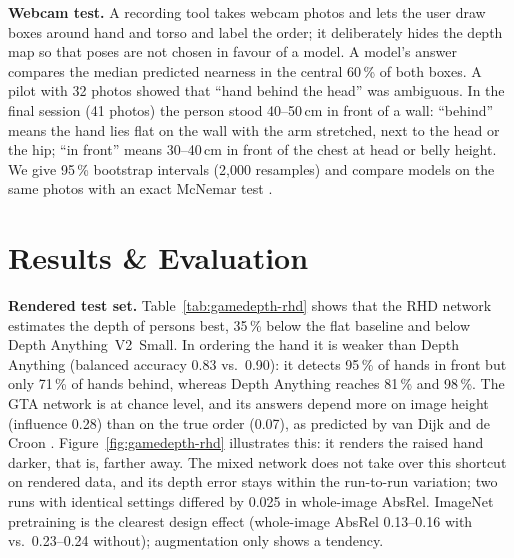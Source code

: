 \documentclass[../../proceedings/main.tex]{subfiles}
\begin{document}
\begin{refsection}
\textbf{Webcam test.} A recording tool takes webcam photos and lets the user
draw boxes around hand and torso and label the order; it deliberately hides
the depth map so that poses are not chosen in favour of a model. A model's
answer compares the median predicted nearness in the central 60\,\% of both
boxes. A pilot with 32 photos showed that ``hand behind the head'' was
ambiguous. In the final session (41 photos) the person stood 40--50\,cm in
front of a wall: ``behind'' means the hand lies flat on the wall with the arm
stretched, next to the head or the hip; ``in front'' means 30--40\,cm in
front of the chest at head or belly height. We give 95\,\% bootstrap intervals (2{,}000 resamples) and
compare models on the same photos with an exact McNemar test
\autocite{gamedepth-mcnemar1947}.

\section{Results \& Evaluation}
\textbf{Rendered test set.} Table~\ref{tab:gamedepth-rhd} shows that the RHD
network estimates the depth of persons best, 35\,\% below the flat baseline
and below Depth Anything~V2~Small. In ordering the hand it is weaker than
Depth Anything (balanced accuracy 0.83 vs.\ 0.90): it detects 95\,\% of hands
in front but only 71\,\% of hands behind, whereas Depth Anything reaches 81\,\%
and 98\,\%. The GTA network is at chance level, and its answers depend more on
image height (influence 0.28) than on the true order (0.07), as predicted by
van Dijk and de Croon \autocite{gamedepth-vandijk2019}. Figure~\ref{fig:gamedepth-rhd}
illustrates this: it renders the raised hand darker, that is, farther away.
The mixed network does not take over this shortcut on rendered data, and its
depth error stays within the run-to-run variation; two runs with identical settings
differed by 0.025 in whole-image AbsRel. ImageNet pretraining is the clearest
design effect (whole-image AbsRel 0.13--0.16 with vs.\ 0.23--0.24 without);
augmentation only shows a tendency.


\end{refsection}
\end{document}
